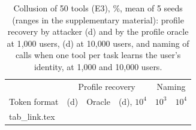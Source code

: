 \begin{table}[t]\centering\caption{Collusion of 50 tools (E3), \%, mean of 5 seeds (ranges in the supplementary material): profile recovery by attacker (d) and by the profile oracle at 1{,}000 users, (d) at 10{,}000 users, and naming of calls when one tool per task learns the user's identity, at 1{,}000 and 10{,}000 users.}\label{tab:link}
\footnotesize\setlength{\tabcolsep}{2.5pt}
\begin{tabular}{@{}lrrrrr@{}}\toprule & \multicolumn{3}{c}{Profile recovery} & \multicolumn{2}{c}{Naming}\\ Token format & (d) & Oracle & (d), $10^4$ & $10^3$ & $10^4$\\\midrule
{} tab_link.tex \end{tabular}\end{table}

